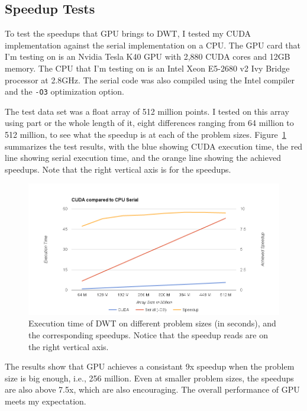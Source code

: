 \documentclass{article}
\begin{document}
\subsection{Speedup Tests}
\label{sec:speedup}
%
To test the speedups that GPU brings to DWT, I tested my CUDA implementation against
the serial implementation on a CPU.
%
The GPU card that I'm testing on is an Nvidia Tesla K40 GPU with 2,880 CUDA cores
and 12GB memory.
%
The CPU that I'm testing on is an Intel Xeon E5-2680 v2 Ivy Bridge processor at 2.8GHz.
%
The serial code was also compiled using the Intel compiler and the \verb|-O3| optimization
option.

The test data set was a float array of 512 million points. 
%
I tested on this array using part or the whole length of it, 
eight differences ranging from 64 million to 512 million, to see what the speedup
is at each of the problem sizes. 
%
Figure~\ref{fig:speedup} summarizes the test results, with 
the blue showing CUDA execution time,
the red line showing serial execution time, 
and the orange line showing the achieved speedups.
%
Note that the right vertical axis is for the speedups.

\begin{figure}
    \centering
    \includegraphics[width=1\textwidth]{speedup.png}
    \caption{Execution time of DWT on different problem sizes (in seconds),
             and the corresponding speedups.
             Notice that the speedup reads are on the right vertical axis.}
    \label{fig:speedup}
\end{figure}

The results show that GPU achieves a consistant 9x speedup when the problem size
is big enough, i.e., 256 million.
%
Even at smaller problem sizes, the speedups are also above 7.5x, which are 
also encouraging.
%
The overall performance of GPU meets my expectation.
\end{document}
